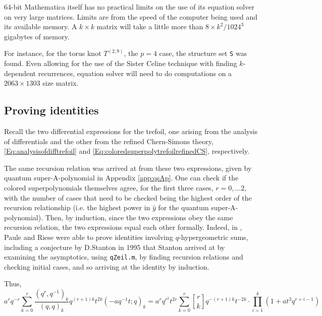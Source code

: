 \documentclass[a4paper,titlepage,twoside]{book}
\begin{document}
\begin{appendix}
64-bit Mathematica itself has no practical limits on the use of its equation solver on very large matrices. Limits are from the speed of the computer being used and its available memory. A $k \times k$ matrix will take a little more than $8 × k^2/1024^3$ gigabytes of memory.

For instance, for the torus knot $T^{(2,9)}$, the $p = 4$ case, the structure set \texttt{S} was found. Even allowing for the use of the Sister Celine technique with finding $k$-dependent recurrences, equation solver will need to do computations on a $2063 \times 1303$ size matrix.

\subsection{Proving identities}

Recall the two differential expressions for the trefoil, one arising from the analysis of differentials and the other from the refined Chern-Simons theory, \eqref{Eq:analysisofdifftrefoil} and \eqref{Eq:coloredsuperpolytrefoilrefinedCS}, respectively.  

The same recursion relation was arrived at from these two expressions, given by quantum super-A-polynomial in Appendix \ref{app:qsAp}.  One can check if the colored superpolynomials themselves agree, for the first three cases, $r=0, \dots 2$, with the number of cases that need to be checked being the highest order of the recursion relationship (i.e. the highest power in $\widehat{y}$ for the quantum super-A-polynomial).  Then, by induction, since the two expressions obey the same recursion relation, the two expressions equal each other formally.  Indeed, in \cite{RieseqZeil}, Paule and Riese were able to prove identities involving $q$-hypergeometric sums, including a conjecture by D.Stanton in 1995 that Stanton arrived at by examining the asymptotics, using \texttt{qZeil.m}, by finding recursion relations and checking initial cases, and so arriving at the identity by induction.  

Thus,
\begin{equation}
a^r q^{-r} \sum_{k=0}^r \frac{ ( q^r, q^{-1} )_k }{ (q,q)_k } q^{(r+1)k } t^{2k} ( -aq^{-1} t; q )_k  =    a^r q^{r^2} t^{2r} \sum_{k=0}^r { r \brack k } q^{ -(r+1)k } t^{-2k } \cdot \prod_{i=1}^k ( 1 + at^3 q^{r + i  -1 } )   \label{Eq:trefoilp01}
\end{equation}



\end{appendix}
\end{document}
